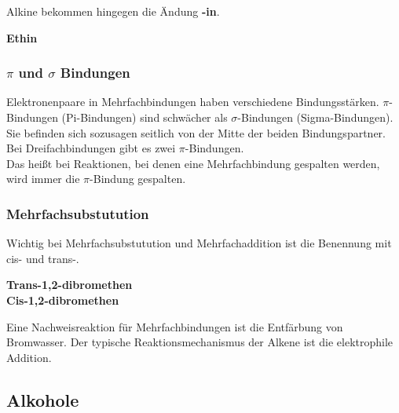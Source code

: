 \documentclass[a4paper]{article}
\begin{document}
Alkine bekommen hingegen die Ändung \textbf{-in}.\\

\begin{center}
     \hspace{1cm} \textbf{Ethin}\\[0,5cm]
\end{center}


\subsubsection{$\pi$ und $\sigma$ Bindungen}

Elektronenpaare in Mehrfachbindungen haben verschiedene Bindungsstärken. $\pi$-Bindungen (Pi-Bindungen) sind schwächer als $\sigma$-Bindungen (Sigma-Bindungen).
Sie befinden sich sozusagen seitlich von der Mitte der beiden Bindungspartner. Bei Dreifachbindungen gibt es zwei $\pi$-Bindungen.\\
Das heißt bei Reaktionen, bei denen eine Mehrfachbindung gespalten werden, wird immer die $\pi$-Bindung gespalten.



\subsubsection{Mehrfachsubstutution}

Wichtig bei Mehrfachsubstutution und Mehrfachaddition ist die Benennung mit cis- und trans-.\\
\begin{center}
     \hspace{1cm} \textbf{Trans-1,2-dibromethen}\\[0,5cm]
     \hspace{1cm} \textbf{Cis-1,2-dibromethen}\\[0,5cm]
\end{center}

Eine Nachweisreaktion für Mehrfachbindungen ist die Entfärbung von Bromwasser. Der typische Reaktionsmechanismus der Alkene ist die elektrophile Addition.


\subsection{Alkohole}
\end{document}
